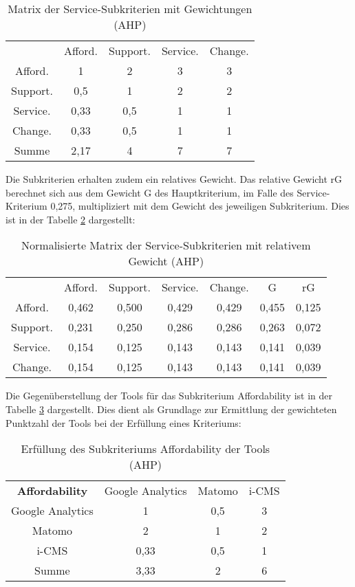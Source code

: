 \begin{table}[h]
	\centering
\begin{tabular}{ccccc}
  & Afford. & Support. & Service. & Change. \\
  Afford. & 1 & 2 & 3 & 3 \\
  Support. & 0,5 & 1 & 2 & 2 \\
  Service. & 0,33 & 0,5 & 1 & 1 \\
  Change. & 0,33 & 0,5 & 1 & 1 \\
  Summe & 2,17 & 4 & 7 & 7 \\
\end{tabular} 
\caption{Matrix der Service-Subkriterien mit Gewichtungen (AHP)}
\label{tab:Matrixsubkritserv}
\end{table}

Die Subkriterien erhalten zudem ein relatives Gewicht. Das relative Gewicht rG berechnet sich aus dem Gewicht G des Hauptkriterium, im Falle des Service-Kriterium 0,275, multipliziert mit dem Gewicht des jeweiligen Subkriterium. Dies ist in der Tabelle \ref{tab:MatrixsubkritservNorm} dargestellt:

\begin{table}[h]
  \centering
  \begin{tabular}{ccccccc}
    & Afford. & Support. & Service. & Change. & G & rG \\
    Afford. & 0,462 & 0,500 & 0,429 & 0,429 & 0,455 & 0,125 \\
    Support. & 0,231 & 0,250 & 0,286 & 0,286 & 0,263 & 0,072 \\
    Service. & 0,154 & 0,125 & 0,143 & 0,143 & 0,141 & 0,039 \\
    Change. & 0,154 & 0,125 & 0,143 & 0,143 & 0,141 & 0,039 \\
    \end{tabular} 
  \caption{Normalisierte Matrix der Service-Subkriterien mit relativem Gewicht (AHP)}
  \label{tab:MatrixsubkritservNorm}
  \end{table}

  Die Gegenüberstellung der Tools für das Subkriterium Affordability ist in der Tabelle \ref{tab:matrixAffordTools} dargestellt. Dies dient als Grundlage zur Ermittlung der gewichteten Punktzahl der Tools bei der Erfüllung eines Kriteriums:

  \begin{table}[h]
    \centering
    \begin{tabular}{cccc}
      \textbf{Affordability} & Google Analytics & Matomo & i-CMS \\
      Google Analytics & 1 & 0,5 & 3 \\
      Matomo & 2 & 1 & 2 \\
      i-CMS & 0,33 & 0,5 & 1 \\
      Summe & 3,33 & 2 & 6 \\
      \end{tabular} 
    \caption{Erfüllung des Subkriteriums Affordability der Tools (AHP)}
    \label{tab:matrixAffordTools}
    \end{table}


